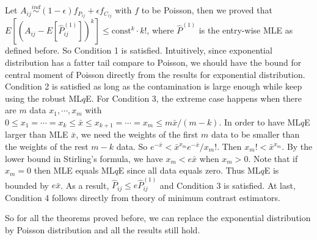 \documentclass[simplex.tex]{subfiles}
\begin{document}
Let $A_{ij} \stackrel{ind}{\sim} (1-\epsilon) f_{P_{ij}} + \epsilon f_{C_{ij}}$ with $f$ to be Poisson, then we proved that $E[(A_{ij} - E[\hat{P}_{ij}^{(1)}])^k] \le \mathrm{const}^k \cdot k!$, where $\hat{P}^{(1)}$ is the entry-wise MLE as defined before.
So Condition 1 is satisfied. Intuitively, since exponential distribution has a fatter tail compare to Poisson, we should have the bound for central moment of Poisson directly from the results for exponential distribution.
Condition 2 is satisfied as long as the contamination is large enough while keep using the robust ML$q$E.
For Condition 3, the extreme case happens when there are $m$ data $x_1, \cdots, x_m$ with $0 \le x_1 = \cdots = x_k \le \bar{x} \le x_{k+1} = \cdots = x_m \le m \bar{x}/(m - k)$. In order to have ML$q$E larger than MLE $\bar{x}$, we need the weights of the first $m$ data to be smaller than the weights of the rest $m - k$ data. So $e^{-\bar{x}} < \bar{x}^{x_m} e^{-\bar{x}} / x_m!$. Then $x_m! < \bar{x}^{x_m}$. By the lower bound in Stirling's formula, we have $x_m < e \bar{x}$ when $x_m > 0$. Note that if $x_m = 0$ then MLE equals ML$q$E since all data equals zero. Thus ML$q$E is bounded by $e \bar{x}$. As a result, $\hat{P}_{ij} \le e \hat{P}_{ij}^{(1)}$ and Condition 3 is satisfied.
At last, Condition 4 follows directly from theory of minimum contrast estimators.

So for all the theorems proved before, we can replace the exponential distribution by Poisson distribution and all the results still hold.

\clearpage
\end{document}
